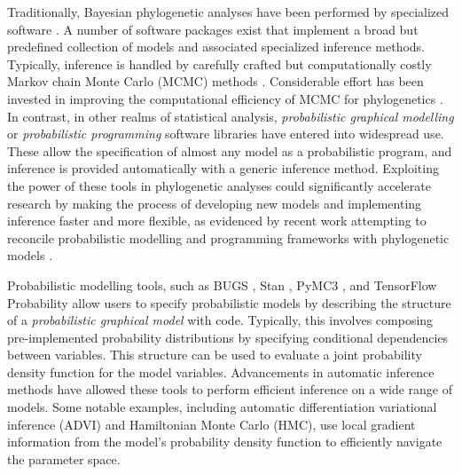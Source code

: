 Traditionally, Bayesian phylogenetic analyses have been performed by specialized software \cite{huelsenbeck2001mrbayes, lartillot2009phylobayes, drummond2012bayesian}. A number of software packages exist that implement a broad but predefined collection of models and associated specialized inference methods. Typically, inference is handled by carefully crafted but computationally costly Markov chain Monte Carlo (MCMC) methods \cite{metropolis1953equation, hastings1970monte}. Considerable effort has been invested in improving the computational efficiency of MCMC for phylogenetics \cite{mateiu2006inferring, lakner2008efficiency, hohna2012guided, zhang2020improving}. In contrast, in other realms of statistical analysis, \textit{probabilistic graphical modelling} or \textit{probabilistic programming} software libraries have entered into widespread use. These allow the specification of almost any model as a probabilistic program, and inference is provided automatically with a generic inference method. Exploiting the power of these tools in phylogenetic analyses could significantly accelerate research by making the process of developing new models and implementing inference faster and more flexible, as evidenced by recent work attempting to reconcile probabilistic modelling and programming frameworks with phylogenetic models \cite{fourment2019evaluating, ronquist2021universal}.

Probabilistic modelling tools, such as BUGS \cite{lunn2000winbugs}, Stan \cite{carpenter2017stan}, PyMC3 \cite{salvatier2016probabilistic}, and TensorFlow Probability \cite{dillon2017tensorflow} allow users to specify probabilistic models by describing the structure of a \textit{probabilistic graphical model} with code. Typically, this involves composing pre-implemented probability distributions by specifying conditional dependencies between variables. This structure can be used to evaluate a joint probability density function for the model variables. Advancements in automatic inference methods have allowed these tools to perform efficient inference on a wide range of models. Some notable examples, including automatic differentiation variational inference \cite{kucukelbir2017automatic} (ADVI) and Hamiltonian Monte Carlo \cite{duane1987hybrid} (HMC), use local gradient information from the model's probability density function to efficiently navigate the parameter space.

